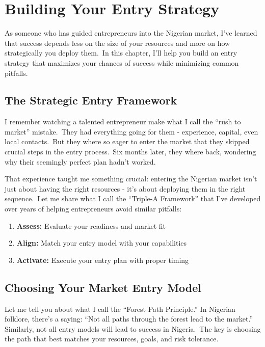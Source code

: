 \chapter{Building Your Entry Strategy}\label{ch:building-your-entry-strategy}

As someone who has guided entrepreneurs into the Nigerian market, I've learned that success depends less on the size of your resources and more on how strategically you deploy them.\ In this chapter, I'll help you build an entry strategy that maximizes your chances of success while minimizing common pitfalls.


\section{The Strategic Entry Framework}\label{sec:the-strategic-entry-framework}

I remember watching a talented entrepreneur make what I call the ``rush to market'' mistake.\ They had everything going for them - experience, capital, even local contacts.\ But they where so eager to enter the market that they skipped crucial steps in the entry process.\ Six months later, they where back, wondering why their seemingly perfect plan hadn't worked.

That experience taught me something crucial: entering the Nigerian market isn't just about having the right resources - it's about deploying them in the right sequence.\ Let me share what I call the ``Triple-A Framework'' that I've developed over years of helping entrepreneurs avoid similar pitfalls:

\begin{enumerate}
    \item \textbf{Assess:} Evaluate your readiness and market fit
    \item \textbf{Align:} Match your entry model with your capabilities
    \item \textbf{Activate:} Execute your entry plan with proper timing
\end{enumerate}


\section{Choosing Your Market Entry Model}\label{sec:choosing-your-market-entry-model}

Let me tell you about what I call the ``Forest Path Principle.'' In Nigerian folklore, there's a saying: ``Not all paths through the forest lead to the market.'' Similarly, not all entry models will lead to success in Nigeria.\ The key is choosing the path that best matches your resources, goals, and risk tolerance.

